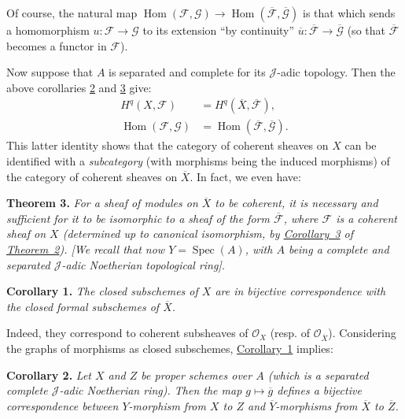 \documentclass{article}
\newenvironment{itenv}[1]
  {\phantomsection\par\medskip\noindent\textbf{#1.}\itshape}
  {\par\medskip}
\newcommand{\scr}[1]{{\mathscr{#1}}}
\DeclareMathOperator{\Spec}{Spec}
\DeclareMathOperator{\Hom}{Hom}
\newcommand{\oldpage}[1]{\marginpar{\footnotesize$\Big\vert$ \textit{p.~#1}}}
\begin{document}
Of course, the natural map $\Hom(\scr{F},\scr{G})\to\Hom(\overline{\scr{F}},\overline{\scr{G}})$ is that which sends a homomorphism $u\colon\scr{F}\to\scr{G}$ to its extension ``by continuity'' $\overline{u}\colon\overline{\scr{F}}\to\overline{\scr{G}}$ (so that $\overline{\scr{F}}$ becomes a functor in $\scr{F}$).

Now suppose that $A$ is separated and complete for its $\scr{J}$-adic topology.
Then the above corollaries \hyperref[theorem2corollary2]{2} and \hyperref[theorem2corollary3]{3} give:
\[
  \begin{aligned}
    H^q(X,\scr{F}) &= H^q(\overline{X},\overline{\scr{F}}),
  \\\Hom(\scr{F},\scr{G}) &= \Hom(\overline{\scr{F}},\overline{\scr{G}}).
  \end{aligned}
\]
\oldpage{182-06}
This latter identity shows that the category of coherent sheaves on $X$ can be identified with a \emph{subcategory} (with morphisms being the induced morphisms) of the category of coherent sheaves on $\overline{X}$.
In fact, we even have:

\begin{itenv}{Theorem 3}
\label{theorem3}
  For a sheaf of modules on $\overline{X}$ to be coherent, it is necessary and sufficient for it to be isomorphic to a sheaf of the form $\overline{\scr{F}}$, where $\scr{F}$ is a coherent sheaf on $X$ (determined up to canonical isomorphism, by \hyperref[theorem2corollary3]{Corollary~3} of \hyperref[theorem2]{Theorem~2}).
  [We recall that now $Y=\Spec(A)$, with $A$ being a complete and separated $\scr{J}$-adic Noetherian topological ring].
\end{itenv}

\begin{itenv}{Corollary 1}
\label{theorem3corollary1}
  The closed subschemes of $X$ are in bijective correspondence with the closed formal subschemes of $\overline{X}$.
\end{itenv}

Indeed, they correspond to coherent subsheaves of $\scr{O}_X$ (resp. of $\scr{O}_{\overline{X}}$).
Considering the graphs of morphisms as closed subschemes, \hyperref[theorem3corollary1]{Corollary~1} implies:

\begin{itenv}{Corollary 2}
\label{theorem3corollary2}
  Let $X$ and $Z$ be proper schemes over $A$ (which is a separated complete $\scr{J}$-adic Noetherian ring).
  Then the map $g\mapsto\overline{g}$ defines a bijective correspondence between $Y$-morphism from $X$ to $Z$ and $\overline{Y}$-morphisms from $\overline{X}$ to $\overline{Z}$.
\end{itenv}
\end{document}

